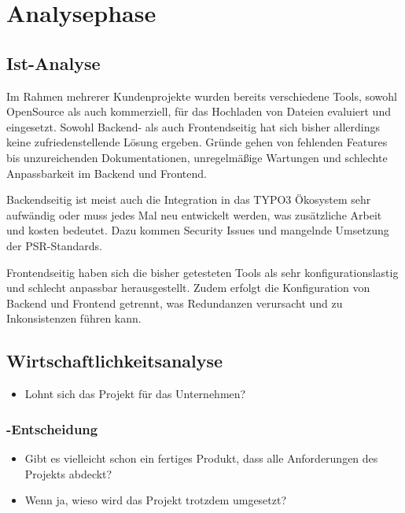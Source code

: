\section{Analysephase} 
\label{sec:Analysephase}


\subsection{Ist-Analyse} 
\label{sec:IstAnalyse}

Im Rahmen mehrerer Kundenprojekte wurden bereits verschiedene Tools, sowohl OpenSource als auch kommerziell, für das Hochladen von Dateien evaluiert und eingesetzt. Sowohl Backend- als auch Frontendseitig hat sich bisher allerdings keine zufriedenstellende Lösung ergeben. Gründe gehen von fehlenden Features bis unzureichenden Dokumentationen, unregelmäßige Wartungen und schlechte Anpassbarkeit im Backend und Frontend. 

Backendseitig ist meist auch die Integration in das TYPO3 Ökosystem sehr aufwändig oder muss jedes Mal neu entwickelt werden, was zusätzliche Arbeit und kosten bedeutet. Dazu kommen Security Issues und mangelnde Umsetzung der PSR-Standards.  

Frontendseitig haben sich die bisher getesteten Tools als sehr konfigurationslastig und schlecht anpassbar herausgestellt. Zudem erfolgt die Konfiguration von Backend und Frontend getrennt, was Redundanzen verursacht und zu Inkonsistenzen führen kann. 


\subsection{Wirtschaftlichkeitsanalyse}
\label{sec:Wirtschaftlichkeitsanalyse}
\begin{itemize}
	\item Lohnt sich das Projekt für das Unternehmen?
\end{itemize}


\subsubsection{-Entscheidung}
\label{sec:MakeOrBuyEntscheidung}
\begin{itemize}
	\item Gibt es vielleicht schon ein fertiges Produkt, dass alle Anforderungen des Projekts abdeckt?
	\item Wenn ja, wieso wird das Projekt trotzdem umgesetzt?
\end{itemize}



